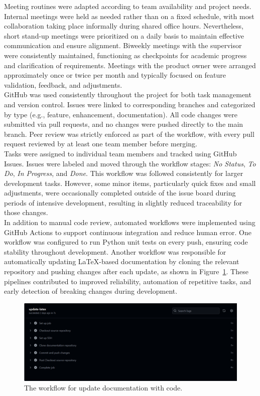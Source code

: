 Meeting routines were adapted according to team availability and project needs. Internal meetings were held as needed rather than on a fixed schedule, with most collaboration taking place informally during shared office hours. Nevertheless, short stand-up meetings were prioritized on a daily basis to maintain effective communication and ensure alignment. Biweekly meetings with the supervisor were consistently maintained, functioning as checkpoints for academic progress and clarification of requirements. Meetings with the product owner were arranged approximately once or twice per month and typically focused on feature validation, feedback, and adjustments. \\

GitHub was used consistently throughout the project for both task management and version control. Issues were linked to corresponding branches and categorized by type (e.g., feature, enhancement, documentation). All code changes were submitted via pull requests, and no changes were pushed directly to the main branch. Peer review was strictly enforced as part of the workflow, with every pull request reviewed by at least one team member before merging. \\

Tasks were assigned to individual team members and tracked using GitHub Issues. Issues were labeled and moved through the workflow stages: \textit{No Status}, \textit{To Do}, \textit{In Progress}, and \textit{Done}. This workflow was followed consistently for larger development tasks. However, some minor items, particularly quick fixes and small adjustments, were occasionally completed outside of the issue board during periods of intensive development, resulting in slightly reduced traceability for those changes.\\

In addition to manual code review, automated workflows were implemented using GitHub Actions to support continuous integration and reduce human error. One workflow was configured to run Python unit tests on every push, ensuring code stability throughout development. Another workflow was responsible for automatically updating LaTeX-based documentation by cloning the relevant repository and pushing changes after each update, as shown in Figure~\ref{fig:workflow-latex}. These pipelines contributed to improved reliability, automation of repetitive tasks, and early detection of breaking changes during development. \\

\begin{figure}[h!] \centering 
\includegraphics[width=0.75\linewidth]{figures/results/workflows/latex.png}\caption[Upload LaTeX workflow]{The workflow for update documentation with code.}\label{fig:workflow-latex} \end{figure}



